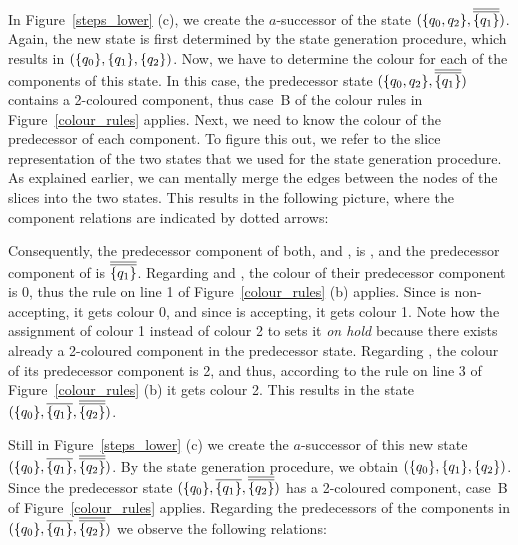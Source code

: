 
In Figure~\ref{steps_lower} (c), we create the $a$-successor of the state $(\qqm02, \cl2{\qm1})$. Again, the new state is first determined by the state generation procedure, which results in $(\{q_{0}\}, \{q_{1}\}, \{q_{2}\})$. Now, we have to determine the colour for each of the components of this state. In this case, the predecessor state $(\qqm02, \cl2{\qm1})$ contains a 2-coloured component, thus case~B of the colour rules in Figure~\ref{colour_rules} applies. Next, we need to know the colour of the predecessor of each component. To figure this out, we refer to the slice representation of the two states that we used for the state generation procedure. As explained earlier, we can mentally merge the edges between the nodes of the slices into the two states. This results in the following picture, where the component relations are indicated by dotted arrows:

\begin{center}
\PredCompsOne
\end{center}

Consequently, the predecessor component of both,  and , is , and the predecessor component of  is $\cl2{\qm1}$. Regarding  and , the colour of their predecessor component is 0, thus the rule on line 1 of Figure~\ref{colour_rules} (b) applies. Since  is non-accepting, it gets colour 0, and since  is accepting, it gets colour 1. Note how the assignment of colour 1 instead of colour 2 to  sets it \textit{on hold} because there exists already a 2-coloured component in the predecessor state. Regarding , the colour of its predecessor component is 2, and thus, according to the rule on line 3 of Figure~\ref{colour_rules} (b) it gets colour 2. This results in the state $(\qm0, \cl1{\qm1}, \cl2{\qm2})$.

Still in Figure~\ref{steps_lower} (c) we create the $a$-successor of this new state $(\qm0, \cl1{\qm1}, \cl2{\qm2})$. By the state generation procedure, we obtain $(\{q_{0}\}, \{q_{1}\}, \{q_{2}\})$. Since the predecessor state  $(\qm0, \cl1{\qm1}, \cl2{\qm2})$ has a 2-coloured component, case~B of Figure~\ref{colour_rules} applies. Regarding the predecessors of the components in $(\qm0, \cl1{\qm1}, \cl2{\qm2})$ we observe the following relations:

\begin{center}
\PredCompsTwo
\end{center}

